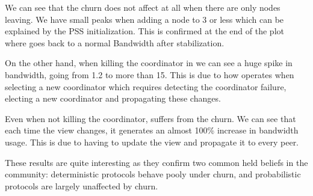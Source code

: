 We can see that the churn does not affect \epto at all when there are only nodes leaving. We have small peaks when adding a node to \SI{3}{\mbps} or less which can be explained by the PSS initialization. This is confirmed at the end of the plot where \epto goes back to a normal Bandwidth after stabilization.

On the other hand, when killing the coordinator in \jgroups we can see a huge spike in bandwidth, going from \SI{1.2}{\mbps} to more than \SI{15}{\mbps}. This is due to how \jgroups operates when selecting a new coordinator which requires detecting the coordinator failure, electing a new coordinator and propagating these changes.

Even when not killing the coordinator, \jgroups suffers from the churn. We can see that each time the view changes, it generates an almost 100\% increase in bandwidth usage. This is due to \jgroups having to update the view and propagate it to every peer.

These results are quite interesting as they confirm two common held beliefs in the community: deterministic protocols behave pooly under churn, and probabilistic protocols are largely unaffected by churn.

